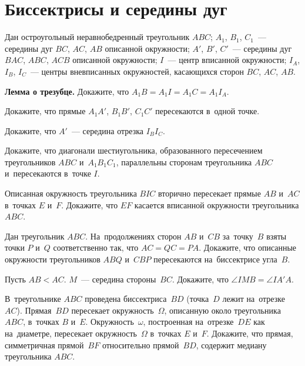 
\section*{Биссектрисы и середины дуг}


Дан остроугольный неравнобедренный треугольник $ABC$;
$A_1$, $B_1$, $C_1$~--- середины дуг $BC$, $AC$, $AB$ описанной окружности;
$A'$, $B'$, $C'$~--- середины дуг $BAC$, $ABC$, $ACB$ описанной окружности;
$I$~--- центр вписанной окружности;
$I_A$, $I_B$, $I_C$~--- центры вневписанных окружностей, касающихся
сторон $BC$, $AC$, $AB$.

\begin{problems}

\item\textbf{Лемма о трезубце.}
Докажите, что
\(
    A_1 B = A_1 I = A_1 C = A_1 I_A
\).

\item
Докажите, что прямые $A_1 A'$, $B_1 B'$, $C_1 C'$ пересекаются в~одной точке.

\item
Докажите, что $A'$~--- середина отрезка $I_B I_C$.

\item
Докажите, что диагонали шестиугольника, образованного пересечением
треугольников $ABC$ и~$A_1 B_1 C_1$, параллельны сторонам треугольника $ABC$
и~пересекаются в~точке $I$.

\item
Описанная окружность треугольника $BIC$ вторично пересекает прямые $AB$ и~$AC$
в~точках $E$ и~$F$.
Докажите, что $EF$ касается вписанной окружности треугольника $ABC$.

\item
Дан треугольник $ABC$.
На~продолжениях сторон $AB$ и~$CB$ за~точку~$B$ взяты точки $P$ и~$Q$
соответственно так, что $AC = QC = PA$.
Докажите, что описанные окружности треугольников $ABQ$ и~$CBP$ пересекаются
на~биссектрисе угла~$B$.

\item
Пусть $AB < AC$.
$M$~--- середина стороны~$BC$.
Докажите, что $\angle {IMB} = \angle {IA'A}$.

\item
В~треугольнике $ABC$ проведена биссектриса~$BD$
(точка~$D$ лежит на~отрезке~$AC$).
Прямая~$BD$ пересекает окружность~$\Omega$, описанную около треугольника $ABC$,
в~точках $B$ и~$E$.
Окружность~$\omega$, построенная на~отрезке~$DE$ как на~диаметре, пересекает
окружность~$\Omega$ в~точках $E$ и~$F$.
Докажите, что прямая, симметричная прямой~$BF$ относительно прямой~$BD$,
содержит медиану треугольника $ABC$.


\end{problems}

